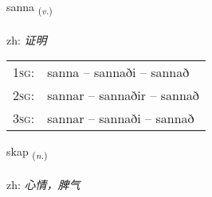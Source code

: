 \documentclass[frontgrid, backgrid]{flacards}\usepackage[]{graphicx}\usepackage[]{color}
\begin{document}
\renewcommand{\flhead}{\vskip5pt \fboxsep=0pt {\small\bfseries\footnotesize Sagnorð | 动词}}
\renewcommand{\fcfoot}{\vskip5pt \fboxsep=0pt \hspace{2pt}{\small\bfseries\footnotesize 2K}}

\renewcommand{\blhead}{\vskip5pt {\small\bfseries\footnotesize Sagnorð | 动词 }}
\renewcommand{\bcfoot}{\vskip5pt \hspace{2pt}{\small\bfseries\footnotesize 2K}}


{sanna \small{\textsubscript{(\textit{v.})}} \\[1ex] %
\textphonetic{[sana]} \\
zh: \emph{证明} \\  [2ex]
\renewcommand*{\arraystretch}{0.8}
\begin{tabular}{p{1cm}l}
\textsc{1sg}: & sanna -- sannaði -- sannað \\ 
\textsc{2sg}: & sannar -- sannaðir -- sannað \\ 
\textsc{3sg}: & sannar -- sannaði -- sannað \\ 
\end{tabular}
}

\renewcommand{\flhead}{\vskip5pt \fboxsep=0pt {\small\bfseries\footnotesize Nafnorð | 名词}}
\renewcommand{\fcfoot}{\vskip5pt \fboxsep=0pt \hspace{2pt}{\small\bfseries\footnotesize 2K}}

\renewcommand{\blhead}{\vskip5pt {\small\bfseries\footnotesize Nafnorð | 名词 }}
\renewcommand{\bcfoot}{\vskip5pt \hspace{2pt}{\small\bfseries\footnotesize 2K}}


{skap \small{\textsubscript{(\textit{n.})}} \\[1ex] %
\textphonetic{[skaːp]} \\
zh: \emph{心情，脾气} \\  [2ex]
\renewcommand*{\arraystretch}{0.8}
}
\end{document}
